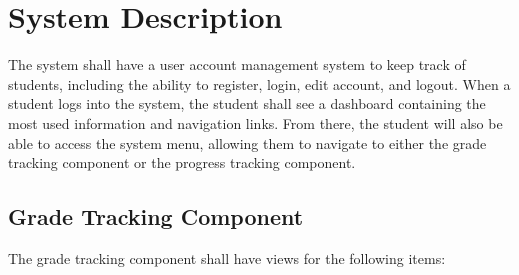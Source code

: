 \documentclass[12pt]{article}
\begin{document}
\section{System Description}
The system shall have a user account management system to keep track of students, including the
ability to register, login, edit account, and logout. When a student logs into the system, the
student shall see a dashboard containing the most used information and navigation links. From there,
the student will also be able to access the system menu, allowing them to navigate to either the
grade tracking component or the progress tracking component.

\subsection{Grade Tracking Component}
The grade tracking component shall have views for the following items:
\end{document}
